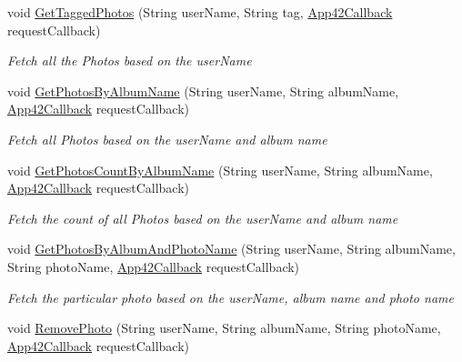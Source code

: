 \begin{DoxyCompactItemize}
\item 
void \hyperlink{classcom_1_1shephertz_1_1app42_1_1paas_1_1sdk_1_1windows_1_1gallery_1_1_photo_service_aa1a3c71730fbadec8389d51f3c0580c3}{Get\+Tagged\+Photos} (String user\+Name, String tag, \hyperlink{interfacecom_1_1shephertz_1_1app42_1_1paas_1_1sdk_1_1windows_1_1_app42_callback}{App42\+Callback} request\+Callback)
\begin{DoxyCompactList}\small\item\em Fetch all the Photos based on the user\+Name \end{DoxyCompactList}\item 
void \hyperlink{classcom_1_1shephertz_1_1app42_1_1paas_1_1sdk_1_1windows_1_1gallery_1_1_photo_service_ad5d57a20edeb47dcfa06357c03e7a2cc}{Get\+Photos\+By\+Album\+Name} (String user\+Name, String album\+Name, \hyperlink{interfacecom_1_1shephertz_1_1app42_1_1paas_1_1sdk_1_1windows_1_1_app42_callback}{App42\+Callback} request\+Callback)
\begin{DoxyCompactList}\small\item\em Fetch all Photos based on the user\+Name and album name \end{DoxyCompactList}\item 
void \hyperlink{classcom_1_1shephertz_1_1app42_1_1paas_1_1sdk_1_1windows_1_1gallery_1_1_photo_service_a1e09e007cfb041b4c2c61a5404c53651}{Get\+Photos\+Count\+By\+Album\+Name} (String user\+Name, String album\+Name, \hyperlink{interfacecom_1_1shephertz_1_1app42_1_1paas_1_1sdk_1_1windows_1_1_app42_callback}{App42\+Callback} request\+Callback)
\begin{DoxyCompactList}\small\item\em Fetch the count of all Photos based on the user\+Name and album name \end{DoxyCompactList}\item 
void \hyperlink{classcom_1_1shephertz_1_1app42_1_1paas_1_1sdk_1_1windows_1_1gallery_1_1_photo_service_a2e63204205edb2dff6e265a2a094e4b7}{Get\+Photos\+By\+Album\+And\+Photo\+Name} (String user\+Name, String album\+Name, String photo\+Name, \hyperlink{interfacecom_1_1shephertz_1_1app42_1_1paas_1_1sdk_1_1windows_1_1_app42_callback}{App42\+Callback} request\+Callback)
\begin{DoxyCompactList}\small\item\em Fetch the particular photo based on the user\+Name, album name and photo name \end{DoxyCompactList}\item 
void \hyperlink{classcom_1_1shephertz_1_1app42_1_1paas_1_1sdk_1_1windows_1_1gallery_1_1_photo_service_a15e710ffb63f062bebeff56ff38e9221}{Remove\+Photo} (String user\+Name, String album\+Name, String photo\+Name, \hyperlink{interfacecom_1_1shephertz_1_1app42_1_1paas_1_1sdk_1_1windows_1_1_app42_callback}{App42\+Callback} request\+Callback)

\end{DoxyCompactItemize}
